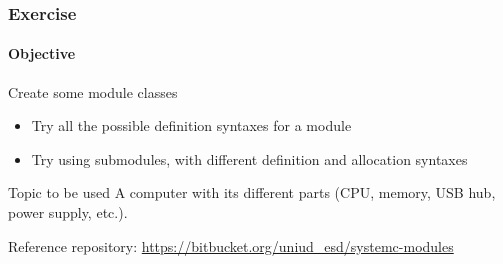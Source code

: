 \begin{frame}
\frametitle{Exercise}
\framesubtitle{Objective}

\begin{block}{Create some module classes}
\begin{itemize}
\item Try all the possible definition syntaxes for a module
\item Try using submodules, with different definition and allocation syntaxes
\end{itemize}
\end{block}
\pause
\begin{block}{Topic to be used}
A computer with its different parts (CPU, memory, USB hub, power supply, etc.).
\end{block}
\pause
\begin{block}{Reference repository:}
\url{https://bitbucket.org/uniud_esd/systemc-modules}
\end{block}
\end{frame}